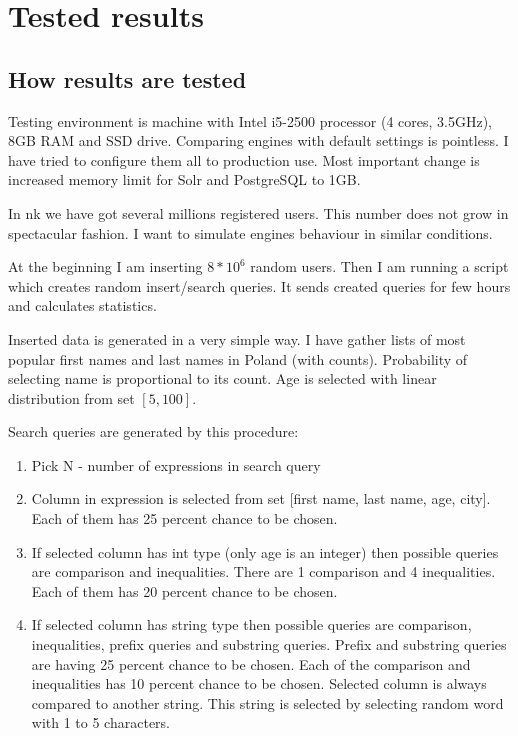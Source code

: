 \documentclass[10pt,a4paper]{article}
\begin{document}
\section{Tested results}

\subsection{How results are tested}

Testing environment is machine with Intel i5-2500 processor (4 cores, 3.5GHz), 8GB RAM and SSD drive. Comparing engines with default settings is pointless. I have tried to configure them all to production use. Most important change is increased memory limit for Solr and PostgreSQL to 1GB.

In nk we have got several millions registered users. This number does not grow in spectacular fashion. I want to simulate engines behaviour in similar conditions. 

At the beginning I am inserting $8 * 10^6$ random users. Then I am running a script which creates random insert/search queries. It sends created queries for few hours and calculates statistics.

Inserted data is generated in a very simple way. I have gather lists of most popular first names and last names in Poland (with counts). Probability of selecting name is proportional to its count. Age is selected with linear distribution from set $[5, 100]$.

Search queries are generated by this procedure:
\begin{enumerate}
\item Pick N - number of expressions in search query
\item Column in expression is selected from set [first name, last name, age, city]. Each of them has 25 percent chance to be chosen.
\item If selected column has int type (only age is an integer) then possible queries are comparison and inequalities. There are 1 comparison and 4 inequalities. Each of them has 20 percent chance to be chosen.
\item If selected column has string type then possible queries are comparison, inequalities, prefix queries and substring queries. Prefix and substring queries are having 25 percent chance to be chosen. Each of the comparison and inequalities has 10 percent chance to be chosen. Selected column is always compared to another string. This string is selected by selecting random word with 1 to 5 characters.
\end{enumerate}
\end{document}
